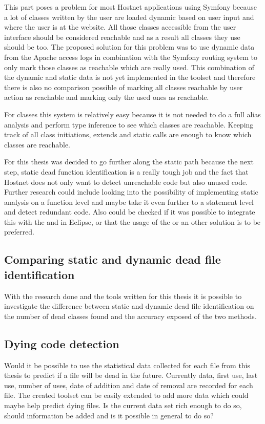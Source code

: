 This part poses a problem for most Hostnet applications using Symfony because a lot of classes written by the user are loaded dynamic based on user input and where the user is at the website. All those classes accessible from the user interface should be considered reachable and as a result all classes they use should be too. The proposed solution for this problem was to use dynamic data from the Apache access logs in combination with the Symfony routing system to only mark those classes as reachable which are really used. This combination of the dynamic and static data is not yet implemented in the toolset and therefore there is also no comparison possible of marking all classes reachable by user action as reachable and marking only the used ones as reachable.

For classes this system is relatively easy because it is not needed to do a full alias analysis and perform type inference to see which classes are reachable. Keeping track of all class initiations, extends and static calls are enough to know which classes are reachable.

For this thesis was decided to go further along the static path because the next step, static dead function identification is a really tough job and the fact that Hostnet does not only want to detect unreachable code but also unused code. Further research could include looking into the possibility of implementing static analysis on a function level and maybe take it even further to a statement level and detect redundant code. Also could be checked if it was possible to integrate this with the \dltk and \pdt in Eclipse, or that the usage of the \phc or an other solution is to be preferred.

\subsection*{Comparing static and dynamic dead file identification}
With the research done and the tools written for this thesis it is possible to investigate the difference between static and dynamic dead file identification on the number of dead classes found and the accuracy exposed of the two methods.

\subsection*{Dying code detection}
Would it be possible to use the statistical data collected for each file from this thesis to predict if a file will be dead in the future. Currently \vcs data, first use, last use, number of uses, date of addition and date of removal are recorded for each file. The created toolset can be easily extended to add more data which could maybe help predict dying files. Is the current data set rich enough to do so, should information be added and is it possible in general to do so?

